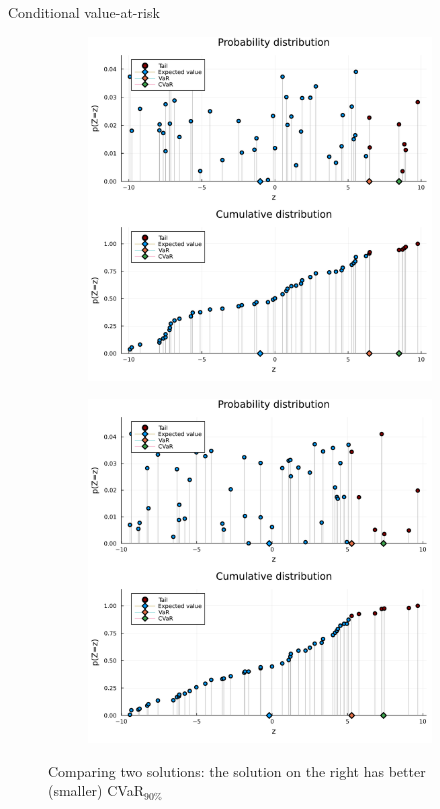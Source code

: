 \begin{frame}{Conditional value-at-risk}

	\begin{figure}
	\centering
	\begin{subfigure}{.5\textwidth}
	  \centering
	  \includegraphics[width=\linewidth]{figures/distributions_CVaR_1.pdf}
	  \label{fig:sub1}
	\end{subfigure}%
	\begin{subfigure}{.5\textwidth}
	  \centering
	  \includegraphics[width=\linewidth]{figures/distributions_CVaR_10.pdf}
	  \label{fig:sub2}
	\end{subfigure}
	\caption{Comparing two solutions: the solution on the right has better (smaller) CVaR$_{90\%}$} 
	\label{fig:test}
	\end{figure}
	
\end{frame}
